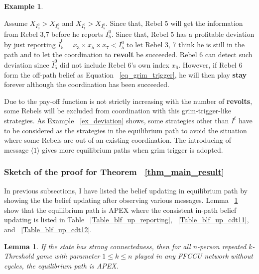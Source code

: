 \documentclass[12pt,letter]{article}
\newtheorem{lemma}{Lemma}[section]
\theoremstyle{definition}
\newtheorem{example}{Example}[section]
\theoremstyle{remark}
\theoremstyle{claim}
\begin{document}
\begin{example}
\begin{center}
\end{center}

Assume $X_{I^0_3}>X_{I^0_5}$ and $X_{I^0_7}>X_{I^0_5}$. Since that, Rebel 5 will get the information from Rebel 3,7 before he reports $I^0_5$. Since that, Rebel 5 has a profitable deviation by just reporting $\bar{I}^0_5=x_3\times x_5\times x_7<I^0_5$ to let Rebel 3, 7 think he is still in the path and to let the coordination to \textbf{revolt} be succeeded. Rebel 6 can detect such deviation since $\bar{I}^0_5$ did not include Rebel 6's own index $x_6$. However, if Rebel 6 form the off-path belief as Equation ~\ref{eq_grim_trigger}, he will then play \textbf{stay} forever although the coordination has been succeeded.

\end{example}

Due to the pay-off function is not strictly increasing with the number of \textbf{revolts}, some Rebels will be excluded from coordination with this grim-trigger-like strategies. As Example ~\ref{ex_deviation} shows, some strategies other than $I^t$ have to be considered as the strategies in the equilibrium path to avoid the situation where some Rebels are out of an existing coordination. The introducing of message $\langle 1 \rangle$ gives more equilibrium paths when grim trigger is adopted. 

\subsubsection{Sketch of the proof for Theorem ~\ref{thm_main_result}}

In previous subsections, I have listed the belief updating in equilibrium path by showing the the belief updating after observing various messages. Lemma ~\ref{lemma_in_the_path} show that the equilibrium path is APEX where the consistent in-path belief updating is listed in Table ~\ref{Table_blf_up_reporting}, ~\ref{Table_blf_up_cdt11}, and ~\ref{Table_blf_up_cdt12}. 
\begin{lemma}\label{lemma_in_the_path}
If the state has strong connectedness, then for all $n$-person repeated $k$-Threshold game with parameter $1\leq k\leq n$ played in any FFCCU network without cycles, the equilibrium path is APEX.
\end{lemma}
\end{document}
